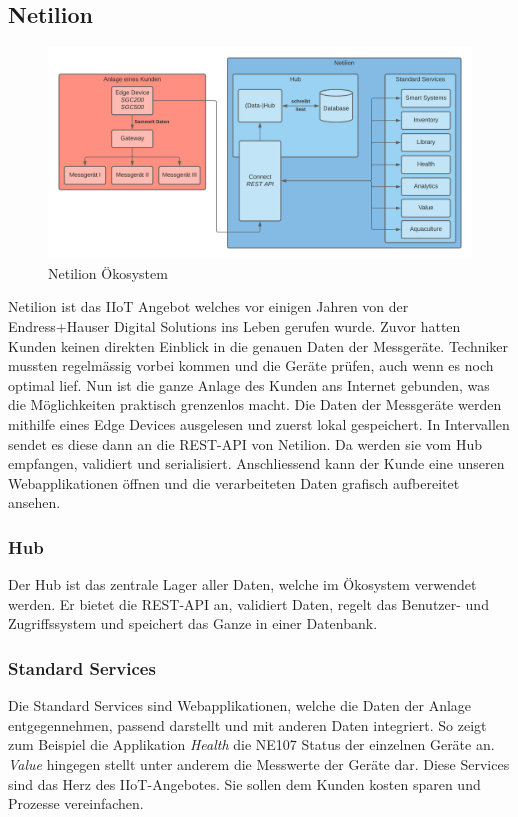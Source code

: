 \subsection{Netilion} \label{arch-netilion}
\begin{figure}[!ht]
  \centering
  \includegraphics[width=.95\linewidth]{./images/Netilion.png}
  \caption[{Diagramm Netilion Ökosystem von Jonas Schultheiss}]{Netilion Ökosystem}
  \label{fig:netilion}
\end{figure}
Netilion ist das IIoT Angebot welches vor einigen Jahren von der Endress+Hauser Digital Solutions ins Leben gerufen wurde. Zuvor hatten Kunden keinen direkten Einblick in die genauen Daten der Messgeräte. Techniker mussten regelmässig vorbei kommen und die Geräte prüfen, auch wenn es noch optimal lief. Nun ist die ganze Anlage des Kunden ans Internet gebunden, was die Möglichkeiten praktisch grenzenlos macht.
\newline
Die Daten der Messgeräte werden mithilfe eines Edge Devices ausgelesen und zuerst lokal gespeichert. In Intervallen sendet es diese dann an die REST-API von Netilion. Da werden sie vom Hub empfangen, validiert und serialisiert. Anschliessend kann der Kunde eine unseren Webapplikationen öffnen und die verarbeiteten Daten grafisch aufbereitet ansehen.
\subsubsection{Hub}
Der Hub ist das zentrale Lager aller Daten, welche im Ökosystem verwendet werden. Er bietet die REST-API an, validiert Daten, regelt das Benutzer- und Zugriffssystem und speichert das Ganze in einer Datenbank.
\subsubsection{Standard Services}
Die Standard Services sind Webapplikationen, welche die Daten der Anlage entgegennehmen, passend darstellt und mit anderen Daten integriert. So zeigt zum Beispiel die Applikation \textit{Health} die NE107 Status der einzelnen Geräte an. \textit{Value} hingegen stellt unter anderem die Messwerte der Geräte dar. Diese Services sind das Herz des IIoT-Angebotes. Sie sollen dem Kunden kosten sparen und Prozesse vereinfachen. 
